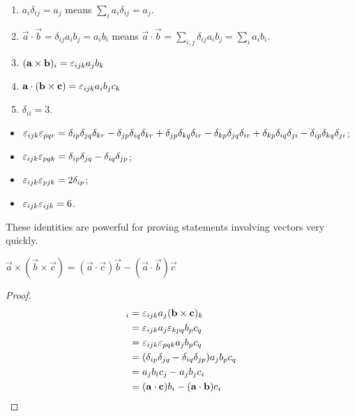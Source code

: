 \documentclass{../../template/note}
\begin{document}
    \begin{example}
        \begin{enumerate}[label=\protect\circled{\arabic*}]
            \item \(a_i \delta_{ij} = a_j\) means \(\sum_i a_i \delta_{ij} = a_j\).
            \item \(\vec a \cdot \vec b = \delta_{ij} a_i b_j = a_ib_i\) means \(\vec a \cdot \vec b = \sum_{i,j} \delta_{ij} a_i b_j = \sum_i a_i b_i\).
            \item \((\vec a \times \vec b)_i = \lv{ijk} a_j b_k\)
            \item \(\vec a \cdot (\vec b \times \vec c) = \lv{ijk} a_i b_j c_k\)
            \item \(\delta_{ii} = 3\).
        \end{enumerate}
        
        
    \end{example}
    
    \begin{proposition}
        \begin{itemize}
            \item \(\varepsilon_{ijk} \varepsilon_{pqr} = \delta_{ip} \delta_{jq} \delta_{kr} - \delta_{jp} \delta_{iq} \delta_{kr} + \delta_{jp} \delta_{kq} \delta_{ir} - \delta_{kp} \delta_{jq} \delta_{ir} + \delta_{kp} \delta_{iq} \delta_{ji} - \delta_{ip} \delta_{kq} \delta_{ji}\);
            \item \(\varepsilon_{ijk}\varepsilon_{pqk} = \delta_{ip} \delta_{jq} - \delta_{iq} \delta_{jp}\);
            \item \(\varepsilon_{ijk} \varepsilon_{pjk} = 2 \delta_{ip}\);
            \item \(\varepsilon_{ijk} \varepsilon_{ijk} = 6\).
        \end{itemize}
    \end{proposition}

    These identities are powerful for proving statements involving vectors very quickly.
    
    \begin{proposition}
        \(\vec a \times (\vec b \times \vec c) = (\vec a \cdot \vec c) \vec b - (\vec a \cdot \vec b) \vec c\)
    \end{proposition}
    
    \begin{proof}
        \begin{align*}
            [\vec a \times (\vec b \times \vec c)]_i &= \lv{ijk} a_j (\vec b \times \vec c)_k \\
            &= \lv{ijk}a_j \lv{kpq} b_p c_q \\
            &= \lv{ijk} \lv{pqk} a_j b_p c_q \\
            &= (\delta_{ip} \delta_{jq} - \delta_{iq} \delta_{jp}) a_j b_p c_q \\
            &= a_j b_i c_j - a_j b_j c_i \\
            &= (\vec a \cdot \vec c) b_i - (\vec a \cdot \vec b) c_i \\
        \end{align*}

    \end{proof}
    
\end{document}

